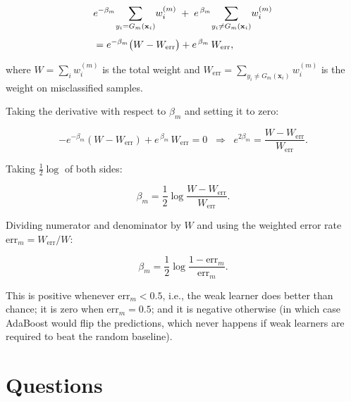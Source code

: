 \documentclass[a4paper,12pt]{article}
\newcommand{\bx}{\mathbf{x}}
\begin{document}
\begin{align}
    &e^{-\beta_m} \!\sum_{y_i = G_m(\bx_i)}\! w_i^{(m)}
    \;+\;
    e^{\,\beta_m}  \!\sum_{y_i \neq G_m(\bx_i)}\! w_i^{(m)} \notag\\[4pt]
    &= e^{-\beta_m}\bigl(W - W_{\mathrm{err}}\bigr) + e^{\,\beta_m}\, W_{\mathrm{err}},
\end{align}

where $W = \sum_i w_i^{(m)}$ is the total weight and
$W_{\mathrm{err}} = \sum_{y_i \neq G_m(\bx_i)} w_i^{(m)}$ is the weight on misclassified
samples.

Taking the derivative with respect to $\beta_m$ and setting it to zero:

\[
    -e^{-\beta_m}(W - W_{\mathrm{err}}) + e^{\,\beta_m}\,W_{\mathrm{err}} = 0
    \;\;\Longrightarrow\;\;
    e^{2\beta_m} = \frac{W - W_{\mathrm{err}}}{W_{\mathrm{err}}}.
\]

Taking $\frac{1}{2}\log$ of both sides:

\[
    \beta_m = \frac{1}{2}\log\frac{W - W_{\mathrm{err}}}{W_{\mathrm{err}}}.
\]

Dividing numerator and denominator by $W$ and using the weighted error rate
$\mathrm{err}_m = W_{\mathrm{err}}/W$:

\[
    \boxed{\beta_m = \frac{1}{2}\log\frac{1 - \mathrm{err}_m}{\mathrm{err}_m}.}
\]

This is positive whenever $\mathrm{err}_m < 0.5$, i.e., the weak learner does better than
chance; it is zero when $\mathrm{err}_m = 0.5$; and it is negative otherwise (in which case
AdaBoost would flip the predictions, which never happens if weak learners are required to
beat the random baseline).

\section{Questions}
\end{document}
